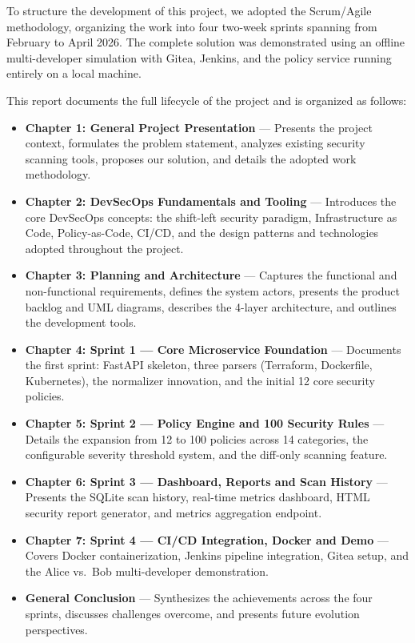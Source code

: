 To structure the development of this project, we adopted the Scrum/Agile methodology, organizing the work into four two-week sprints spanning from February to April 2026. The complete solution was demonstrated using an offline multi-developer simulation with Gitea, Jenkins, and the policy service running entirely on a local machine.

This report documents the full lifecycle of the project and is organized as follows:

\begin{itemize}
    \item \textbf{Chapter 1: General Project Presentation} — Presents the project context, formulates the problem statement, analyzes existing security scanning tools, proposes our solution, and details the adopted work methodology.
    \item \textbf{Chapter 2: DevSecOps Fundamentals and Tooling} — Introduces the core DevSecOps concepts: the shift-left security paradigm, Infrastructure as Code, Policy-as-Code, CI/CD, and the design patterns and technologies adopted throughout the project.
    \item \textbf{Chapter 3: Planning and Architecture} — Captures the functional and non-functional requirements, defines the system actors, presents the product backlog and UML diagrams, describes the 4-layer architecture, and outlines the development tools.
    \item \textbf{Chapter 4: Sprint 1 — Core Microservice Foundation} — Documents the first sprint: FastAPI skeleton, three parsers (Terraform, Dockerfile, Kubernetes), the normalizer innovation, and the initial 12 core security policies.
    \item \textbf{Chapter 5: Sprint 2 — Policy Engine and 100 Security Rules} — Details the expansion from 12 to 100 policies across 14 categories, the configurable severity threshold system, and the diff-only scanning feature.
    \item \textbf{Chapter 6: Sprint 3 — Dashboard, Reports and Scan History} — Presents the SQLite scan history, real-time metrics dashboard, HTML security report generator, and metrics aggregation endpoint.
    \item \textbf{Chapter 7: Sprint 4 — CI/CD Integration, Docker and Demo} — Covers Docker containerization, Jenkins pipeline integration, Gitea setup, and the Alice vs.\ Bob multi-developer demonstration.
    \item \textbf{General Conclusion} — Synthesizes the achievements across the four sprints, discusses challenges overcome, and presents future evolution perspectives.
\end{itemize}
